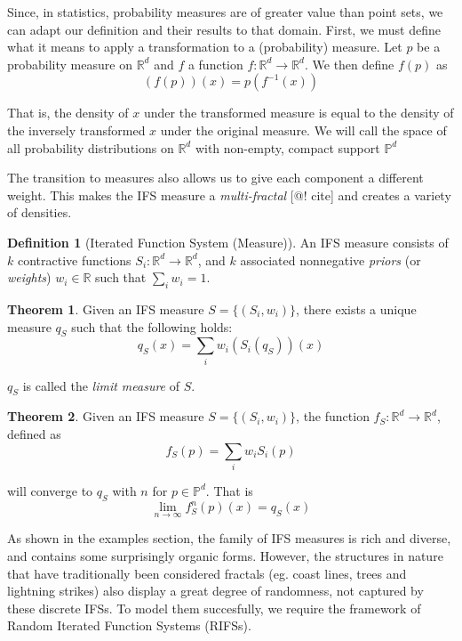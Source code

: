 \documentclass[10pt,a4paper,oneside]{article}
\theoremstyle{definition}
\newtheorem*{thm}{Theorem}
\newtheorem*{dfn}{Definition}
\begin{document}
Since, in statistics, probability measures are of greater value than point sets, we can adapt our definition and their results to that domain. First, we must define what it means to apply a transformation to a (probability) measure. Let $p$ be a probability measure on ${\mathbb R}^d$ and $f$ a function $f:{\mathbb R}^d \rightarrow {\mathbb R}^d$. We then define $f(p)$ as 
\[
	\left (f(p) \right ) (x) = p(f^{-1}(x))
\]

That is, the density of $x$ under the transformed measure is equal to the density of the inversely transformed $x$ under the original measure. We will call the space of all probability distributions on ${\mathbb R}^d$ with non-empty, compact support ${\mathbb P}^d$

The transition to measures also allows us to give each component a different weight. This makes the IFS measure a \emph{multi-fractal} [@! cite] and creates a variety of densities.

\begin{dfn}[Iterated Function System (Measure)]
An IFS measure consists of $k$ contractive functions $S_i:{\mathbb R}^d \rightarrow {\mathbb R}^d$, and $k$ associated nonnegative \emph{priors} (or \emph{weights}) $w_i \in {\mathbb R}$ such that $\sum_i w_i = 1$.
\end{dfn}

\begin{thm}
Given an IFS measure $S = \{(S_i, w_i)\}$, there exists a unique measure $q_S$ such that the following holds:
\[
q_S(x) = \sum_i w_i \left(S_i(q_S)\right)(x)
\]
\end{thm}

$q_S$ is called the \emph{limit measure} of $S$. 

\begin{thm}
Given an IFS measure $S = \{(S_i, w_i)\}$, the function $f_S:{\mathbb R}^d \rightarrow {\mathbb R^d}$, defined as 
\[
f_S(p) = \sum_i w_i S_i(p)
\]

will converge to $q_S$ with $n$ for $p \in {\mathbb P}^d$. That is
\[
\lim_{n \rightarrow \infty} f_S^{n}(p)(x) = q_S(x)
\]
\end{thm}

As shown in the examples section, the family of IFS measures is rich and diverse, and contains some surprisingly organic forms. However, the structures in nature that have traditionally been considered fractals (eg. coast lines, trees and lightning strikes) also display a great degree of randomness, not captured by these discrete IFSs. To model them succesfully, we require the framework of Random Iterated Function Systems (RIFSs). 
\end{document}
